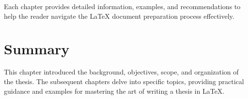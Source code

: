 		Each chapter provides detailed information, examples, and recommendations to help the reader navigate the \LaTeX{} document preparation process effectively.

	\section{Summary}
		This chapter introduced the background, objectives, scope, and organization of the thesis. 
		The subsequent chapters delve into specific topics, providing practical guidance and examples for mastering the art of writing a thesis in \LaTeX.
\begin{comment}
  The first page of the introduction is marked as page ``1'' and then the pages that follow are numbered sequentially.

  The minimum academic requirements for the text of a thesis are an introduction, followed by the presentation of the research in a manner suitable for the field, and a conclusion.

  The introduction must outline the thesis, problem, hypothesis, questions or goals of the research.
  It must provide a clear statement of the research question(s).
  The conclusion must highlight the student’s contribution to knowledge, providing conclusions with respect to the problem, hypothesis or goals of the research.
  In all theses, regardless of format, the body or chapters of the thesis contain methodology, research results, and scholarly discussion in accordance with the norms of the academic discipline.

  The University of Alberta encourages students to publish.
  Thus, one or more chapters of a thesis may contain published material if permitted by the regulations of your department (or Faculty if non-departmentalized) governing your specific degree program.
  It is a matter for individual graduate programs to develop specific guidance for students and supervisors, as well as supervisory committee members, with such specific guidance likely to reflect the needs of the particular field or academic discipline.

  For example, individual graduate programs that continue to prefer the traditional monograph-style thesis may have department-specific rules on such matters as maximum length (taking into account the burden on an external examiner to read a thesis that is over 100,000 words).
  Individual graduate programs that opt for a multiple-manuscript or journal-article format, or choose to accept both traditional and paper-based formats, or a combination of both, must have department-specific guidelines in place to address potential student and supervisor queries.
  For example, the department-specific guidance needs to address what counts as a publication (\textit{e.g. } self-publication, any journal, or only journals listed in a particular source); whether a paper-based thesis can include both published and accepted papers; whether the student must be the first author for a multiple-authored publication to be acceptable for inclusion within the thesis; and whether some form of connecting text is needed to link the papers beyond the introduction (and if so, what form or forms of connectors are acceptable).


\end{comment}
